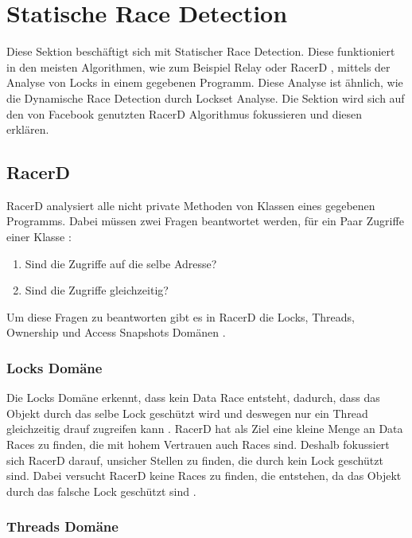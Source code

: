 \section{Statische Race Detection}

Diese Sektion beschäftigt sich mit Statischer Race Detection. Diese funktioniert in den meisten Algorithmen, wie zum Beispiel Relay \cite[vgl.][208]{relay} oder RacerD \cite[vgl.][57]{nikos_2019}, mittels der Analyse von Locks in einem gegebenen Programm. Diese Analyse ist ähnlich, wie die Dynamische Race Detection durch Lockset Analyse. Die Sektion wird sich auf den von Facebook genutzten RacerD Algorithmus \cite[vgl.][2]{racerd} fokussieren und diesen erklären. 

\subsection*{RacerD}

RacerD analysiert alle nicht private Methoden von Klassen eines gegebenen Programms. Dabei müssen zwei Fragen beantwortet werden, für ein Paar Zugriffe einer Klasse \cite[vgl.][7]{racerd}:

\begin{enumerate}
	\item Sind die Zugriffe auf die selbe Adresse?
	\item Sind die Zugriffe gleichzeitig?
\end{enumerate}

Um diese Fragen zu beantworten gibt es in RacerD die Locks, Threads, Ownership und Access Snapshots Domänen \cite[vgl.][7-8]{racerd}. 

\subsubsection*{Locks Domäne}

Die Locks Domäne erkennt, dass kein Data Race entsteht, dadurch, dass das Objekt durch das selbe Lock geschützt wird und deswegen nur ein Thread gleichzeitig drauf zugreifen kann \cite[vgl.][8]{racerd}. RacerD hat als Ziel eine kleine Menge an Data Races zu finden, die mit hohem Vertrauen auch Races sind. Deshalb fokussiert sich RacerD darauf, unsicher Stellen zu finden, die durch kein Lock geschützt sind. Dabei versucht RacerD keine Races zu finden, die entstehen, da das Objekt durch das falsche Lock geschützt sind \cite[vgl.][9]{racerd}. 

\subsubsection*{Threads Domäne}

